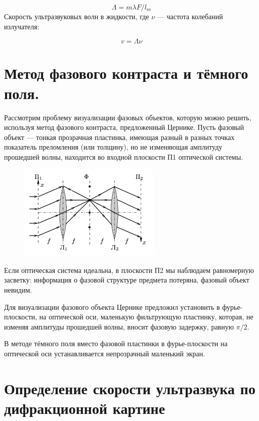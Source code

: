 \documentclass[14pt,a4paper]{article}
\begin{document}
	\begin{equation}\label{}
	 \Lambda = m \lambda F/ l_m
	\end{equation}
	Скорость ультразвуковых волн в жидкости, где $ \nu $ --- частота колебаний излучателя:

\begin{equation}\label{}
	v = \Lambda \nu
\end{equation}

    \section*{Метод фазового контраста и тёмного поля. } Рассмотрим проблему визуализации фазовых объектов, которую можно решить, используя метод фазового контраста, предложенный Цернике. Пусть фазовый объект — тонкая прозрачная пластинка, имеющая разный в разных точках показатель преломления (или толщину), но не изменяющая амплитуду прошедшей волны, находится во входной плоскости П1 оптической системы.

    \begin{figure}[H]
		\centering
		\includegraphics[width=0.6\textwidth]{Images/4f.png}
		\label{diff}
	\end{figure}

    Если оптическая система идеальна, в плоскости П2 мы наблюдаем равномерную засветку: информация о фазовой структуре предмета потеряна, фазовый объект невидим.

    Для визуализации фазового объекта Цернике предложил установить в фурье-плоскости, на оптической оси, маленькую фильтрующую пластинку, которая, не изменяя амплитуды прошедшей волны, вносит фазовую задержку, равную $\pi/2$.

    В методе тёмного поля вместо фазовой пластинки в фурье-плоскости на оптической оси устанавливается непрозрачный маленький экран.


\section*{Определение скорости ультразвука по дифракционной картине}
\end{document}
